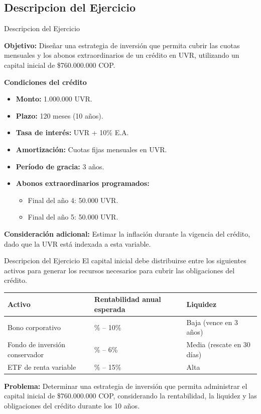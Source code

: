 \documentclass[10pt]{beamer}
\begin{document}
\subsection{Descripcion del Ejercicio}

\begin{frame}{Descripcion del Ejercicio}

\small

\textbf{Objetivo:} Diseñar una estrategia de inversión que permita cubrir las cuotas mensuales y los abonos extraordinarios de un crédito en UVR, utilizando un capital inicial de \$760.000.000 COP.

\textbf{Condiciones del crédito}

\begin{itemize}
    \item \textbf{Monto:} 1.000.000 UVR.
    \item \textbf{Plazo:} 120 meses (10 años).
    \item \textbf{Tasa de interés:} UVR + 10\% E.A.
    \item \textbf{Amortización:} Cuotas fijas mensuales en UVR.
    \item \textbf{Período de gracia:} 3 años.
    \item \textbf{Abonos extraordinarios programados:}
    \begin{itemize}
        \item Final del año 4: 50.000 UVR.
        \item Final del año 5: 50.000 UVR.
    \end{itemize}
\end{itemize}

\textbf{Consideración adicional:} Estimar la inflación durante la vigencia del crédito, dado que la UVR está indexada a esta variable.

\end{frame}


\begin{frame}{Descripcion del Ejercicio}
\small
El capital inicial debe distribuirse entre los siguientes activos para generar los recursos necesarios para cubrir las obligaciones del crédito.

\begin{center}
\renewcommand{\arraystretch}{1.25}
\begin{tabular}{|p{3.7cm}|p{3.9cm}|p{3.5cm}|}
\hline
\centering\textbf{Activo} & 
\centering\textbf{Rentabilidad anual esperada} & 
\centering\textbf{Liquidez} \tabularnewline
\hline
Bono corporativo & 
\centering 7\% -- 10\% & 
Baja (vence en 3 años) \tabularnewline
\hline
Fondo de inversión conservador & 
\centering 4\% -- 6\% & 
Media (rescate en 30 días) \tabularnewline
\hline
ETF de renta variable & 
\centering 8\% -- 15\% & 
Alta \tabularnewline
\hline
\end{tabular}
\end{center}

\textbf{Problema:} Determinar una estrategia de inversión que permita administrar el capital inicial de \$760.000.000 COP, considerando la rentabilidad, la liquidez y las obligaciones del crédito durante los 10 años.
\end{frame}
\end{document}

